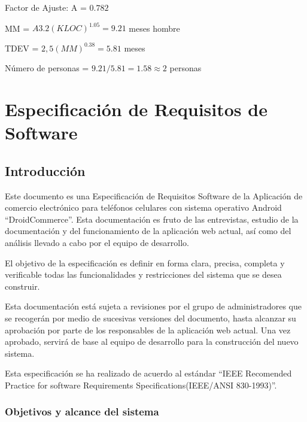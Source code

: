     
Factor de Ajuste: A = $0.782$
\\

\begin{framed}
\centering
MM = $A 3.2 (KLOC)^{1.05} = 9.21$ meses hombre

TDEV = $2,5 (MM)^{0.38} = 5.81$ meses

Número de personas = ${9.21}/{5.81} = 1.58 \approx 2$ personas
\end{framed}

\section{Especificación de Requisitos de Software}
\setcounter{secnumdepth}{2}
\renewcommand{\thesubsection}{\arabic{subsection}}
 \subsection{Introducción}
 
 Este documento es una Especificación de Requisitos Software de la Aplicación de comercio electrónico para teléfonos celulares con sistema operativo Android “DroidCommerce”. Esta documentación es fruto de las entrevistas, estudio de la documentación y del funcionamiento de la aplicación web actual, así como del análisis llevado a cabo por el equipo de desarrollo.

El objetivo de la especificación es definir en forma clara, precisa, completa y verificable todas las funcionalidades y restricciones del sistema que se desea construir.

Esta documentación está sujeta a revisiones por el grupo de administradores que se recogerán por medio de sucesivas versiones del documento, hasta alcanzar su aprobación por parte de los responsables de la aplicación web actual. Una vez aprobado, servirá de base al equipo de desarrollo para la construcción del nuevo sistema.

Esta especificación se ha realizado de acuerdo al estándar “IEEE Recomended Practice for software Requirements Specifications(IEEE/ANSI 830-1993)”.

 
    \subsubsection{Objetivos y alcance del sistema}

